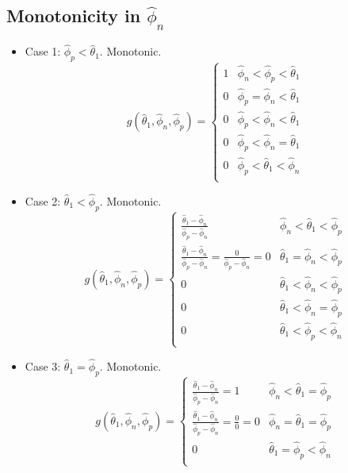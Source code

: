\documentclass[AMA,STIX1COL]{WileyNJD-v2}
\begin{document}
\subsection{Monotonicity in \( \hat{\phi}_n \)}


\begin{itemize}
	\item Case 1: \( \hat{\phi}_p < \hat{\theta}_1 \). Monotonic. \\
\begin{equation} 
g(\hat{\theta}_1, \hat{\phi}_n, \hat{\phi}_p)
=
\left\{ 
\begin{array}{ll}
1 & \hat{\phi}_n < \hat{\phi}_p < \hat{\theta}_1  \\
0 & \hat{\phi}_p = \hat{\phi}_n < \hat{\theta}_1 \\
0 &	\hat{\phi}_p < \hat{\phi}_n < \hat{\theta}_1 \\
0 & \hat{\phi}_p < \hat{\phi}_n = \hat{\theta}_1 \\
0 & \hat{\phi}_p < \hat{\theta}_1 < \hat{\phi}_n \\
\end{array}
\right.
\end{equation}

\item Case 2: \( \hat{\theta}_1 < \hat{\phi}_p \). Monotonic.
\begin{equation} 
g(\hat{\theta}_1, \hat{\phi}_n, \hat{\phi}_p)
=
\left\{ 
\begin{array}{ll}
\frac{\hat{\theta}_1 - \hat{\phi}_n}{\hat{\phi}_p - \hat{\phi}_n} & \hat{\phi}_n < \hat{\theta}_1 < \hat{\phi}_p  \\
\frac{\hat{\theta}_1 - \hat{\phi}_n}{\hat{\phi}_p - \hat{\phi}_n} = \frac{0}{\hat{\phi}_p - \hat{\phi}_n} = 0 & \hat{\theta}_1 = \hat{\phi}_n < \hat{\phi}_p \\
0 &	\hat{\theta}_1 < \hat{\phi}_n < \hat{\phi}_p \\
0 & \hat{\theta}_1 < \hat{\phi}_n = \hat{\phi}_p \\
0 & \hat{\theta}_1 < \hat{\phi}_p < \hat{\phi}_n \\
\end{array}
\right.
\end{equation}

\item Case 3: \( \hat{\theta}_1 = \hat{\phi}_p \). Monotonic. \\
\begin{equation} 
g(\hat{\theta}_1, \hat{\phi}_n, \hat{\phi}_p)
=
\left\{ 
\begin{array}{ll}
\frac{\hat{\theta}_1 - \hat{\phi}_n}{\hat{\phi}_p - \hat{\phi}_n} = 1 & \hat{\phi}_n < \hat{\theta}_1 = \hat{\phi}_p	\\
\frac{\hat{\theta}_1 - \hat{\phi}_n}{\hat{\phi}_p - \hat{\phi}_n} = \frac{0}{0} = 0 & \hat{\phi}_n = \hat{\theta}_1 = \hat{\phi}_p 	\\
0 & \hat{\theta}_1 = \hat{\phi}_p < \hat{\phi}_n	\\
\end{array}
\right.
\end{equation}
\end{itemize}
\end{document}
